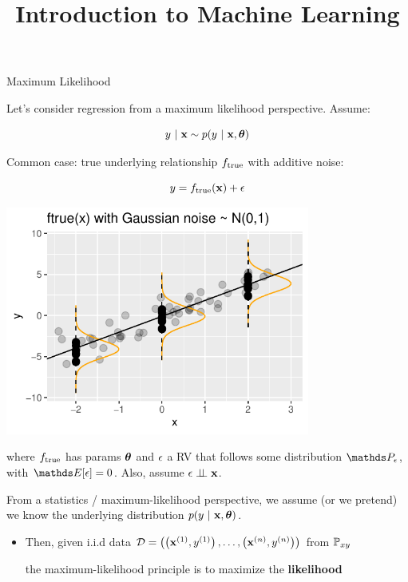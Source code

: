 \documentclass[11pt,compress,t,notes=noshow, xcolor=table]{beamer}
\title{Introduction to Machine Learning}
\institute{\href{https://compstat-lmu.github.io/lecture_i2ml/}{compstat-lmu.github.io/lecture\_i2ml}}
\date{}
\begin{document}

\begin{vbframe}{Maximum Likelihood}

Let's consider regression from a maximum likelihood perspective. Assume: 

$$
	y~|~ \mathbf{x} \sim p(y~|~\mathbf{x}, \bm{\theta}) 
$$

\vspace{0.5cm}

Common case: 
true underlying relationship $f_{\text{true}}$ with additive noise: 

\vspace{0.5cm}

\begin{minipage}{0.5\textwidth}
$$
y = f_{\text{true}}(\mathbf{x}) + \epsilon
$$
\end{minipage}%
\begin{minipage}{0.5\textwidth}
\includegraphics[width = 0.75\textwidth]{figure/ftrue.pdf}
\end{minipage}

where $f_{\text{true}}$ has params $\bm{\theta}$ and $\epsilon$ a RV that follows some distribution $\P_\eps$, with $\E[\eps] = 0$. Also, assume $\epsilon \perp \!\!\! \perp \mathbf{x}$. 


\framebreak 

From a statistics / maximum-likelihood perspective, we assume (or we pretend) we know the underlying distribution $p(y~|~\mathbf{x}, \bm{\theta})$. 

\begin{itemize}
\item Then, given i.i.d data $
\mathcal{D} = \left( \left(\mathbf{x}^{(1)}, y^{(1)}\right), \ldots, \left(\mathbf{x}^{(n)}, y^{(n)}\right)\right)
$
 from $\mathbb{P}_{xy}$ 

the maximum-likelihood principle is to maximize the \textbf{likelihood}


\end{itemize}
\end{vbframe}
\end{document}
